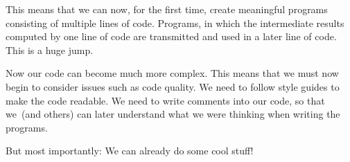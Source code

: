 This means that we can now, for the first time, create meaningful programs consisting of multiple lines of code.
Programs, in which the intermediate results computed by one line of code are transmitted and used in a later line of code.
This is a huge jump.

Now our code can become much more complex.
This means that we must now begin to consider issues such as code quality.
We need to follow style guides to make the code readable.
We need to write comments into our code, so that we~(and others) can later understand what we were thinking when writing the programs.

But most importantly:
We can already do some cool stuff!%
\endhsection%
%
\FloatBarrier%
\endhsection%
%
